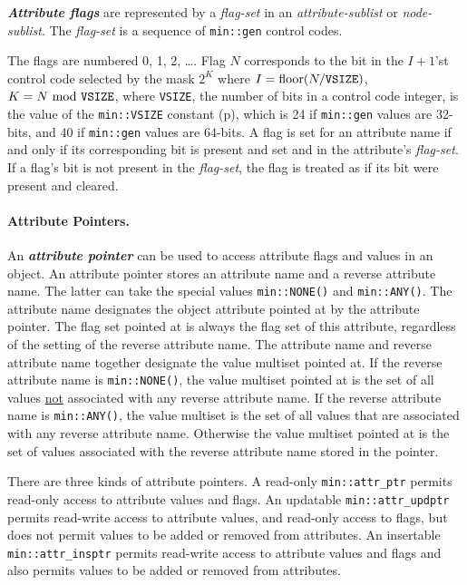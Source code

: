\documentclass[12pt]{article}
\newcommand{\subsubsubsection}[1]{\paragraph[#1]{#1.}}
\newcommand{\key}[1]{{\bf \em #1}\index{#1}}
\newcommand{\ikey}[2]{{\bf \em #1}\index{#2}}
\newcommand{\pagref}[1]{p\pageref{#1}}
\newcommand{\EOL}{\penalty \exhyphenpenalty}
\begin{document}
\ikey{Attribute flags}{attribute flag!representation}\label{ATTRIBUTE-FLAGS}
are represented by a {\em flag-set} in an {\em attribute-sublist} or
{\em node-sublist}.
The {\em flag-set} is a sequence of \verb|min::gen|
control codes.

The flags are numbered 0, 1, 2, \ldots.  Flag $N$ corresponds to
the bit in the $I+1$'st control code
selected by the mask $2^K$ where $I=\mbox{floor}(N/\mbox{\tt VSIZE})$,
$K=N~\mbox{mod}~\mbox{\tt VSIZE}$, where {\tt VSIZE},
the number of bits in a control code integer,
is the value of the \verb|min::VSIZE| constant (\pagref{MIN::VSIZE}),
which is 24 if \verb|min::gen|
values are 32-bits, and 40 if \verb|min::gen| values are 64-bits.
A flag is set for an attribute name if and only if its corresponding
bit is present and set and in the attribute's {\em flag-set}.
If a flag's bit is not present in the {\em flag-set}, the flag is
treated as if its bit were present and cleared.

\subsubsubsection{Attribute Pointers}
\label{ATTRIBUTE-POINTERS}

An \key{attribute pointer} can be used to access attribute
flags and values
in an object.
An attribute pointer stores an attribute name
and a reverse attribute name.  The latter can take the special
values {\tt min::NONE()} and {\tt min::ANY()}.  The attribute name designates
the object attribute pointed at by the attribute pointer.
The flag set pointed at is always
the flag set of this attribute, regardless of the setting of the
reverse attribute name.  The attribute name and
reverse attribute name together designate the
value multiset pointed at.  If the reverse attribute name
is {\tt min::NONE()}, the value multiset pointed at is the set of all values
\underline{not} associated with any reverse attribute name.  If the
reverse attribute name is {\tt min::ANY()},
the value multiset is the set of all
values that are associated with any reverse attribute name.
Otherwise the value multiset pointed at is the set of values
associated with the reverse attribute name stored in the pointer.

There are three kinds of attribute pointers.
A read-only {\tt min::\EOL attr\_\EOL ptr}
permits read-only access to attribute values and flags.
An updatable {\tt min::\EOL attr\_\EOL updptr}
permits read-write access to attribute values, and read-only access
to flags, but does not permit values to be added or removed from attributes.
An insertable {\tt min::\EOL attr\_\EOL insptr}
permits read-write access to attribute values and flags
and also permits values to be added or removed from attributes.
\end{document}
